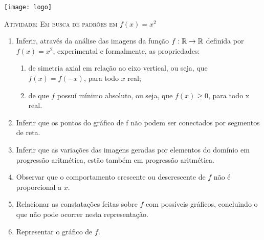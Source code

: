 \documentclass[10 pt,usenames,dvipsnames, oneside]{article}
\begin{document}
\begin{center}
  \begin{minipage}[l]{3cm}
\texttt{[image: logo]}    
\end{minipage}\hfill
\begin{minipage}[r]{.8\textwidth}
 {\Large \scshape Atividade: Em busca de padrões em \(f(x)=x^2\)}  
\end{minipage}
\end{center}
\vspace{.2cm}

\ifdefined\prof

\begin{goals}
\begin{enumerate}
\item Inferir, através da análise das imagens da função $f:\mathbb{R}\to\mathbb{R}$ definida por $f(x)=x^2$, experimental e formalmente, as propriedades:

\begin{enumerate}[leftmargin=2.5pt]
\item de simetria axial em relação ao eixo vertical, ou seja, que $f(x)=f(−x)$, para todo $x$ real;

\item de que $f$ possuí mínimo absoluto, ou seja, que $f(x)\geq0$, para todo x real.
\end{enumerate}

\item Inferir que os pontos do gráfico de f não podem ser conectados por segmentos de reta.

\item Inferir que as variações das imagens geradas por elementos do domínio em progressão aritmética, estão também em progressão aritmética.

\item Observar que o comportamento crescente ou descrescente de $f$ não é proporcional a $x$.

\item Relacionar as constatações feitas sobre $f$ com possíveis gráficos, concluindo o que não pode ocorrer nesta representação.

\item Representar o gráfico de $f$.
\end{enumerate}


\end{goals}
\end{document}
